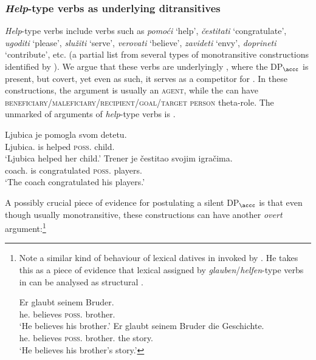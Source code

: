 \documentclass[output=paper,modfonts,newtxmath,hidelinks]{langscibook}
\begin{document}
\subsubsection{\textit{Help}-type verbs as underlying ditransitives}

\textit{Help}-type verbs include verbs such as \textit{pomoći} `help', \textit{čestitati} `congratulate', \textit{ugodi\-ti} `please', \textit{služiti} `serve', \textit{verovati} `believe', \textit{zavideti} `envy', \textit{doprineti} `contribute', etc. (a partial list from several types of monotransitive  constructions identified by \citealt{stipcevic}). We argue that these verbs are underlyingly , where the  DP$_{\accc}$ is present, but covert, yet even as such, it serves as a competitor for  . In these constructions, the \nomm{} argument is usually an \textsc{agent}, while the \datt{} can have \textsc{be\-ne\-fi\-ciary}/\textsc{male\-fi\-ciary}/\textsc{re\-ci\-pi\-ent}/\textsc{goal}/\textsc{tar\-get person} theta-role. The unmarked  of arguments of \textit{help}-type verbs is \nomm{} \before{} \datt{} .

\ea\label{16:ex26}
\ea\gll Ljubica je pomogla svom detetu.\\
Ljubica.\nomm{} is helped \textsc{poss}.\datt{} child.\datt\\
\glt `Ljubica helped her child.'
\ex\gll Trener je  čestitao svojim igračima.\\
coach.\nomm{} is congratulated \textsc{poss}.\datt{} players.\datt\\
\glt `The coach congratulated his players.'
\z \z

\noindent A possibly crucial piece of evidence for postulating a silent DP$_{\accc}$ is that even though usually monotransitive, these constructions can have another \textit{overt} \accc{} argument:\footnote{Note a similar kind of behaviour of lexical datives in  invoked by \citep[129]{mcfadden04}. He takes this as a piece of evidence that lexical  assigned by \textit{glauben}/\textit{helfen}-type verbs in  can be analysed as structural .
	
	\ea
	\ea\gll Er glaubt seinem Bruder.\\
	he.\nomm{} believes \textsc{poss}.\datt{} brother.\datt\\
	\glt `He believes his brother.'
	\ex\gll Er glaubt seinem Bruder die Geschichte.\\
	he.\nomm{} believes \textsc{poss}.\datt{} brother.\datt{} the story.\accc\\
	\glt `He believes his brother's story.'
    \z \z
	
	
}
\end{document}
